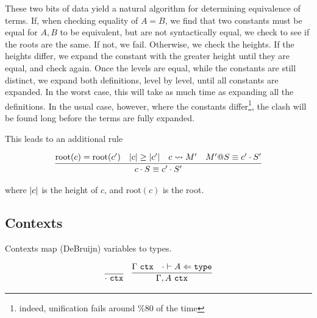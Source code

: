\documentclass[11pt,twoside]{article}
\begin{document}
These two bits of data yield a natural algorithm for determining 
equivalence of terms.  If, when checking equality of $A=B$,
we find that two constants must be equal for $A,B$ to
be equivalent, but are not syntactically equal, 
we check to see if the roots are the same.
If not, we fail.  Otherwise, we check the heights.  If the heights
differ, we expand the constant with the greater height until 
they are equal, and check again.  Once the levels
are equal, while the constants are still distinct, we 
expand both definitions, level by level, until all constants
are expanded.  In the worst case, this will take as much time
as expanding all the definitions.  In the usual case, however,
where the constants differ\footnote{indeed, unification fails
around \%80 of the time}, the clash will be found long before
the terms are fully expanded.  

This leads to an additional rule 

\newcommand{\Root}{\mbox{root}}
$$
\begin{array}{cccc}
\infer{\Equiv{c\cdot S}{c'\cdot S'}}{\Root(c)=\Root(c') & \card{c} \geq \card{c'} & c\StepsTo M' & \Equiv{M'@S}{c'\cdot S'}} 
\end{array} 
$$

where $\left|c\right|$ is the height of $c$, and $\Root(c)$ is the root.


\subsection{Contexts}

Contexts map (DeBruijn) variables to types.  

\newcommand{\Ctx}{\ \mathtt{ctx}}
\bigskip 
\framebox{$\Gamma\Ctx$}
\bigskip 

$$
\begin{array}{cc}
\infer{\cdot\Ctx}{} &
\infer{\Gamma,A\Ctx}{\Gamma\Ctx & \CheckTy[\cdot]{A}{\Type}}
\end{array} 
$$

\end{document}
